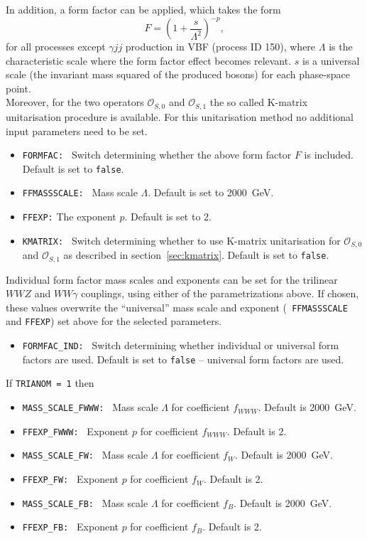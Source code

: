 \documentclass[english,12pt]{article}
\begin{document}
In addition, a form factor can be applied, which takes the form
\begin{equation}
 F = \left(1 + \frac{s}{\Lambda^{2}} \right)^{-p},
\end{equation}
for all processes except $\gamma jj$ production in VBF (process ID 150),
where $\Lambda$ is the characteristic scale where the form factor effect becomes relevant.  $s$ is a universal scale (the
invariant mass squared of the produced bosons) for each phase-space point.\\
Moreover, for the two operators $\mathcal{O}_{S,0}$ and $\mathcal{O}_{S,1}$ the
so called K-matrix unitarisation procedure is available. For this unitarisation
method no additional input parameters need to be set. 
\begin{itemize}
 \item {\tt FORMFAC: }  Switch determining whether the above form factor $F$ is
included.  Default is set to {\tt false}.
 \item {\tt FFMASSSCALE: } Mass scale $\Lambda$.  Default is set to 2000~GeV.
 \item {\tt FFEXP:} The exponent $p$.  Default is set to 2.
\item {\tt KMATRIX: }  Switch determining whether to use K-matrix unitarisation
	for $\mathcal{O}_{S,0}$ and $\mathcal{O}_{S,1}$ as described in section~\ref{sec:kmatrix}. Default is set to {\tt false}.
\end{itemize}
Individual form factor mass scales and exponents can be set for the trilinear
$WWZ$ and $WW\gamma$ couplings, using either of the parametrizations above.  If
chosen, these values overwrite the ``universal'' mass scale and exponent ({\tt
FFMASSSCALE} and {\tt FFEXP}) set above for the selected parameters.
\begin{itemize}
 \item {\tt FORMFAC\_IND: } Switch determining whether individual or universal
form factors are used.  Default is set to {\tt false} -- universal form factors are used.
\end{itemize}
If {\tt TRIANOM = 1} then
\begin{itemize}
 \item {\tt MASS\_SCALE\_FWWW: } Mass scale $\Lambda$ for coefficient $f_{WWW}$.
 Default is 2000~GeV.
 \item {\tt FFEXP\_FWWW: } Exponent $p$ for coefficient $f_{WWW}$.  Default is 2.
 \item {\tt MASS\_SCALE\_FW: } Mass scale $\Lambda$ for coefficient $f_{W}$. 
Default is 2000~GeV.
 \item {\tt FFEXP\_FW: } Exponent $p$ for coefficient $f_{W}$.  Default is 2.
 \item {\tt MASS\_SCALE\_FB: } Mass scale $\Lambda$ for coefficient $f_{B}$. 
Default is 2000~GeV.
 \item {\tt FFEXP\_FB: } Exponent $p$ for coefficient $f_{B}$.  Default is 2.
\end{itemize}
\end{document}
